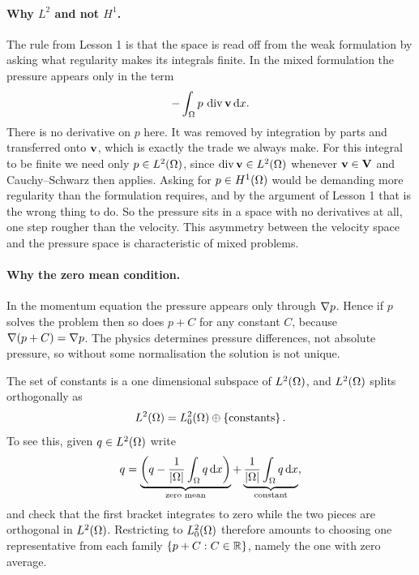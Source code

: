 \documentclass[11pt,a4paper]{article}
\newcommand{\Vsp}{\mathbf{V}}
\begin{document}
\paragraph{Why $L^{2}$ and not $H^{1}$.}
The rule from Lesson 1 is that the space is read off from the weak formulation
by asking what regularity makes its integrals finite. In the mixed formulation
the pressure appears only in the term
\[
  - \int_\Omega p \,\operatorname{div} \mathbf{v} \,\mathrm{d}x .
\]
There is no derivative on $p$ here. It was removed by integration by parts and
transferred onto $\mathbf{v}$, which is exactly the trade we always make. For this
integral to be finite we need only $p \in L^{2}(\Omega)$, since $\operatorname{div} \mathbf{v} \in L^{2}(\Omega)$
whenever $\bv \in \Vsp$ and Cauchy--Schwarz then applies. Asking for $p \in
H^{1}(\Omega)$ would be demanding more regularity than the formulation requires, and by
the argument of Lesson 1 that is the wrong thing to do. So the pressure sits in
a space with no derivatives at all, one step rougher than the velocity. This
asymmetry between the velocity space and the pressure space is characteristic of
mixed problems.

\paragraph{Why the zero mean condition.}
In the momentum equation the pressure appears only through $\nabla p$. Hence if
$p$ solves the problem then so does $p + C$ for any constant $C$, because
$\nabla(p+C) = \nabla p$. The physics determines pressure differences, not
absolute pressure, so without some normalisation the solution is not unique.

The set of constants is a one dimensional subspace of $L^{2}(\Omega)$, and $L^{2}(\Omega)$
splits orthogonally as
\[
  L^{2}(\Omega) = L^{2}_{0}(\Omega) \oplus \left\{ \text{constants} \right\} .
\]
To see this, given $q \in L^{2}(\Omega)$ write
\[
  q = \underbrace{\left( q - \frac{1}{\left\lvert \Omega \right\rvert}\int_\Omega q \,\mathrm{d}x \right)}_{\text{zero mean}}
  + \underbrace{\frac{1}{\left\lvert \Omega \right\rvert}\int_\Omega q \,\mathrm{d}x}_{\text{constant}} ,
\]
and check that the first bracket integrates to zero while the two pieces are
orthogonal in $L^{2}(\Omega)$. Restricting to $L^{2}_{0}(\Omega)$ therefore amounts to choosing
one representative from each family $\{p + C : C \in \mathbb{R}\}$, namely the one with
zero average.
\end{document}
